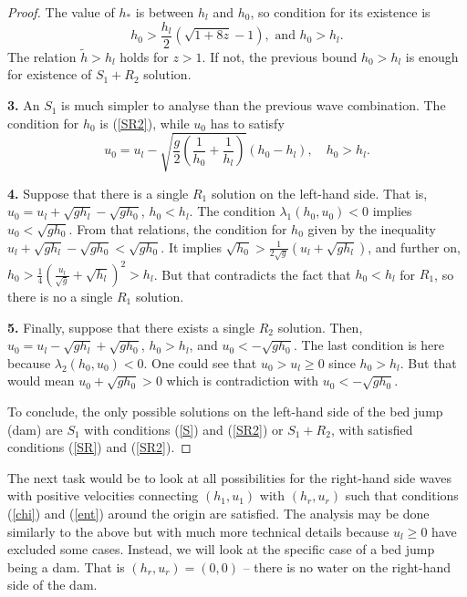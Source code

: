 \documentclass{article}
\theoremstyle{plain}
\theoremstyle{definition}
\theoremstyle{remark}
\begin{document}
\begin{proof}
The value of $h_{\ast}$ is between $h_{l}$ and $h_{0}$, so condition
for its existence is  
\begin{equation*} 
h_{0} > \frac{h_l}{2}\left( \sqrt{1+8z} - 1 \right), \text{ and } h_{0}>h_{l}.
\end{equation*}
The relation $\tilde{h}>h_{l}$ holds for
$z > 1$. If not, the previous bound 
$h_{0}>h_{l}$ is enough for existence of $S_{1}+R_{2}$ solution.

\noindent \textbf{3.}
An $S_{1}$ is much simpler to analyse than 
the previous wave combination. 
The condition for $h_{0}$ is (\ref{SR2}), while $u_{0}$ has to satisfy  
\begin{equation*} 
u_{0} = u_{l} - \sqrt{\frac{g}{2} \left( \frac{1}{h_{0}}+\frac{1}{h_{l}} \right)}
\left( h_{0} - h_{l} \right), \quad h_{0} > h_{l}.
\end{equation*}

\noindent \textbf{4.}
Suppose that there is a single $R_{1}$ solution on the left-hand 
side. That is,  
\(u_{0} = u_{l} + \sqrt{gh_{l}} - \sqrt{gh_{0}}\), \(h_{0}<h_{l}\). 
The condition $\lambda_{1}(h_{0},u_{0})<0$ implies  
\(u_{0} < \sqrt{gh_{0}}\).
From that relations, the condition for \(h_{0}\) given by 
the inequality 
\( u_{l} + \sqrt{gh_{l}} - \sqrt{gh_{0}} < \sqrt{gh_{0}}\). 
It implies \(\sqrt{h_{0}} > \frac{1}{2\sqrt{g}}(u_{l} + \sqrt{gh_{l}})\),
and further on, 
\(h_{0} > \frac{1}{4}\left( \frac{u_{l}}{\sqrt{g}} + \sqrt{h_{l}} \right)^{2} > h_{l}\).
But that contradicts the fact that \(h_{0}<h_{l}\) for $R_1$, so there is no
a single $R_{1}$ solution.

\noindent \textbf{5.}
Finally, suppose that there exists a single $R_{2}$ solution. Then,
\(u_{0} = u_{l} - \sqrt{gh_{l}} + \sqrt{gh_{0}}\), \(h_{0}>h_{l}\),
and \(u_{0} < -\sqrt{gh_{0}}\). The last condition is here because
$\lambda_{2}(h_{0},u_{0})<0$. One could see that $u_{0}>u_{l} \geq 0$ 
since $h_{0}>h_{l}$. But that would mean $u_{0}+\sqrt{gh_{0}}>0$ which
is contradiction with $u_{0}<-\sqrt{gh_{0}}$.

To conclude, the only possible solutions on the left-hand
side of the bed jump (dam) are
\(S_{1}\) with conditions (\ref{S}) and (\ref{SR2}) or 
\(S_{1}+R_{2}\), with satisfied conditions (\ref{SR}) and (\ref{SR2}).
\end{proof}

The next task would be to look at all possibilities for 
the right-hand side waves with positive velocities connecting 
$(h_{1},u_{1})$ with  $(h_{r},u_{r})$ such that conditions
(\ref{chi}) and (\ref{ent}) around the origin
are satisfied.
The analysis may be done similarly to the above but with much more technical
details because $u_{l}\geq 0$ have excluded some cases. 
Instead, we will look at the specific case of a bed jump
being a dam. That is $(h_{r},u_{r})=(0,0)$ 
-- there is no water on the right-hand side of the dam. 
\end{document}
